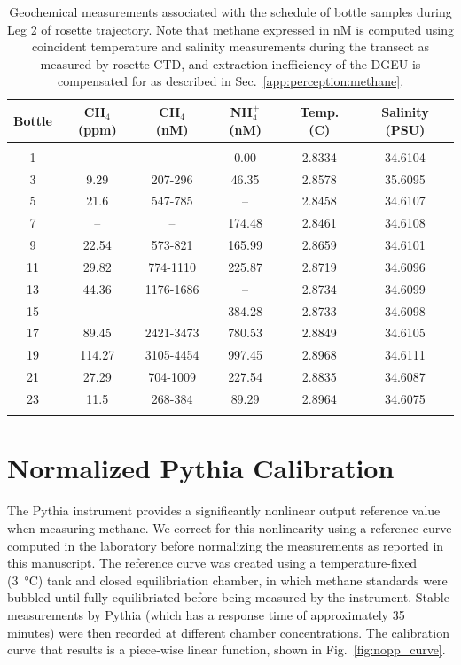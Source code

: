 \begin{table}[h!]
    \centering
    \begin{tabular}{c|c|c|c|c|c}
        Bottle & CH$_4$ (ppm) & CH$_4$ (nM) & NH$_4^+$ (nM) & Temp. (C) & Salinity (PSU) \\
        \hline
        \hline
        &&&&&\\
        1 & -- & -- & 0.00 & 2.8334 & 34.6104 \\
        3 & 9.29 & 207-296 & 46.35 & 2.8578 & 35.6095 \\ 
        5 & 21.6 & 547-785 & -- & 2.8458 & 34.6107 \\
        7 & -- & -- & 174.48 & 2.8461 & 34.6108 \\
        9 & 22.54 & 573-821 & 165.99 & 2.8659 & 34.6101 \\
        11 & 29.82 & 774-1110 & 225.87 & 2.8719 & 34.6096 \\
        13 & 44.36 & 1176-1686 & -- & 2.8734 & 34.6099 \\
        15 & -- & -- & 384.28 & 2.8733 & 34.6098 \\
        17 & 89.45 & 2421-3473 & 780.53 & 2.8849 & 34.6105 \\
        19 & 114.27 & 3105-4454 & 997.45 & 2.8968 & 34.6111 \\
        21 & 27.29 & 704-1009 & 227.54 & 2.8835 & 34.6087 \\
        23 & 11.5 & 268-384 & 89.29 & 2.8964 & 34.6075 \\
        &&&&&
    \end{tabular}
    \caption[Geochemical measurements collected during leg 2 of rosette transect]{Geochemical measurements associated with the schedule of bottle samples during Leg 2 of rosette trajectory. Note that methane expressed in nM is computed using coincident temperature and salinity measurements during the transect as measured by rosette CTD, and extraction inefficiency of the DGEU is compensated for as described in Sec.~\ref{app:perception:methane}.}
    \label{tab:niskin_sched_results}
\end{table}


\section{Normalized Pythia Calibration}
\label{app:perception:norm}
The Pythia instrument provides a significantly nonlinear output reference value when measuring methane. We correct for this nonlinearity using a reference curve computed in the laboratory before normalizing the measurements as reported in this manuscript. The reference curve was created using a temperature-fixed (\SI{3}{\celsius}) tank and closed equilibriation chamber, in which methane standards were bubbled until fully equilibriated before being measured by the instrument. Stable measurements by Pythia (which has a response time of approximately 35 minutes) were then recorded at different chamber concentrations. The calibration curve that results is a piece-wise linear function, shown in Fig.~\ref{fig:nopp_curve}.

